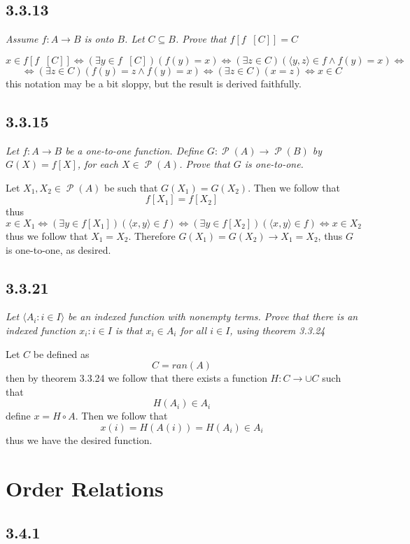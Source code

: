 \documentclass[11pt,oneside,titlepage]{book}
\DeclareMathOperator \pow {\mathcal {P}}
\DeclareMathOperator \inv {^{-1}}
\DeclareMathOperator \lra {\Leftrightarrow}
\newcommand{\eangle}[1]{\langle #1 \rangle}
\begin{document}
\subsection*{3.3.13}

\textit{Assume $f: A \to B$ is onto $B$. Let $C \subseteq B$. Prove that $f[f\inv[C]] = C$}

$$x \in f[f\inv[C]] \lra (\exists y \in f\inv[C])(f(y) = x) \lra
(\exists z \in C)(\eangle{y, z} \in f \land f(y) = x) \lra$$
$$ \lra (\exists z \in C)(f(y) = z \land f(y) = x) \lra (\exists z \in C)(x = z) \lra x \in C$$
this notation may be a bit sloppy, but the result is derived faithfully.

\subsection*{3.3.15}

\textit{Let $f: A \to B$ be a one-to-one function. Define $G: \pow(A) \to \pow(B)$ by
  $G(X) = f[X]$, for each $X \in \pow(A)$. Prove that $G$ is one-to-one.}

Let $X_1, X_2 \in \pow(A)$ be such that $G(X_1) = G(X_2)$. Then we follow that
$$f[X_1] = f[X_2]$$
thus
$$x \in X_1 \lra (\exists y \in f[X_1])(\eangle{x, y} \in f) \lra
(\exists y \in f[X_2])(\eangle{x, y} \in f) \lra x \in X_2$$
thus we follow that $X_1 = X_2$. Therefore $G(X_1) = G(X_2) \to X_1 = X_2$, thus $G$ is
one-to-one, as desired.

\subsection*{3.3.21}

\textit{Let $\eangle{A_i: i \in I}$ be an indexed function with nonempty terms. Prove that there
  is an indexed function ${x_i: i \in I}$ is that $x_i \in A_i$ for all $i \in I$, using
  theorem 3.3.24}

Let $C$ be defined as
$$C = ran(A)$$
then by theorem 3.3.24 we follow that there exists a function $H: C \to \cup C$ such that
$$H(A_i) \in A_i$$
define $x = H \circ A $. Then we follow that
$$x(i) = H(A(i)) = H(A_i) \in A_i$$
thus we have the desired function.

\section{Order Relations}

\subsection*{3.4.1}
\end{document}

